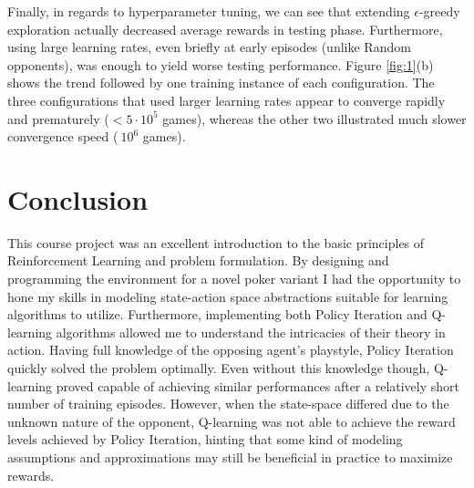 Finally, in regards to hyperparameter tuning, we can see that extending $\epsilon$-greedy exploration actually decreased average rewards in testing phase. Furthermore, using large learning rates, even briefly at early episodes (unlike Random opponents), was enough to yield worse testing performance. Figure \ref{fig:1}(b) shows the trend followed by one training instance of each configuration. The three configurations that used larger learning rates appear to converge rapidly and prematurely ($<5\cdot10^5$ games), whereas the other two illustrated much slower convergence speed ($~10^6$ games).

\section{Conclusion}

This course project was an excellent introduction to the basic principles of Reinforcement Learning and problem formulation. By designing and programming the environment for a novel poker variant I had the opportunity to hone my skills in modeling state-action space abstractions suitable for learning algorithms to utilize. Furthermore, implementing both Policy Iteration and Q-learning algorithms allowed me to understand the intricacies of their theory in action. Having full knowledge of the opposing agent's playstyle, Policy Iteration quickly solved the problem optimally. Even without this knowledge though, Q-learning proved capable of achieving similar performances after a relatively short number of training episodes. However, when the state-space differed due to the unknown nature of the opponent, Q-learning was not able to achieve the reward levels achieved by Policy Iteration, hinting that some kind of modeling assumptions and approximations may still be beneficial in practice to maximize rewards.

\clearpage

